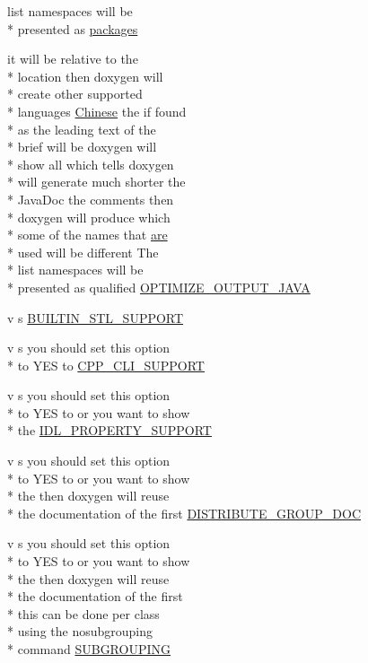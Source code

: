 \begin{DoxyCompactItemize}
list namespaces will be \\*
presented as \hyperlink{mkdoc_8dox_a299b82abc5d35aed83d60f05c2cb228c}{packages}
\item 
it will be relative to the \\*
location then doxygen will \\*
create other supported \\*
languages \hyperlink{mkdoc_8dox_ab6ff97d2e5e9fa61c208d5f0eee91c62}{Chinese} the if found \\*
as the leading text of the \\*
brief will be doxygen will \\*
show all which tells doxygen \\*
will generate much shorter the \\*
Java\-Doc the comments then \\*
doxygen will produce which \\*
some of the names that \hyperlink{mkdoc_8dox_a6d0965b20c4eb2235e8f9f5f0e5193ae}{are} \\*
used will be different The \\*
list namespaces will be \\*
presented as qualified \hyperlink{mkdoc_8dox_afd2bb55c95bb3cedff4f1baa0d0f09e1}{O\-P\-T\-I\-M\-I\-Z\-E\-\_\-\-O\-U\-T\-P\-U\-T\-\_\-\-J\-A\-V\-A}
\item 
v s \hyperlink{mkdoc_8dox_ab43c02f50185eae26e7fdfe802989f59}{B\-U\-I\-L\-T\-I\-N\-\_\-\-S\-T\-L\-\_\-\-S\-U\-P\-P\-O\-R\-T}
\item 
v s you should set this option \\*
to Y\-E\-S to \hyperlink{mkdoc_8dox_ad95e419f1790fce508581809c7b5dd7f}{C\-P\-P\-\_\-\-C\-L\-I\-\_\-\-S\-U\-P\-P\-O\-R\-T}
\item 
v s you should set this option \\*
to Y\-E\-S to or you want to show \\*
the \hyperlink{mkdoc_8dox_a09c760dfd058001a9247df20dd282ea2}{I\-D\-L\-\_\-\-P\-R\-O\-P\-E\-R\-T\-Y\-\_\-\-S\-U\-P\-P\-O\-R\-T}
\item 
v s you should set this option \\*
to Y\-E\-S to or you want to show \\*
the then doxygen will reuse \\*
the documentation of the first \hyperlink{mkdoc_8dox_a2d6cc054818b29cdad766ec1e51d30f0}{D\-I\-S\-T\-R\-I\-B\-U\-T\-E\-\_\-\-G\-R\-O\-U\-P\-\_\-\-D\-O\-C}
\item 
v s you should set this option \\*
to Y\-E\-S to or you want to show \\*
the then doxygen will reuse \\*
the documentation of the first \\*
this can be done per class \\*
using the nosubgrouping \\*
command \hyperlink{mkdoc_8dox_ae6985312f7898cf37a90edd149dbd7fc}{S\-U\-B\-G\-R\-O\-U\-P\-I\-N\-G}
\end{DoxyCompactItemize}


